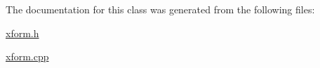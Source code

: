 The documentation for this class was generated from the following files\-:\begin{DoxyCompactItemize}
\item 
\hyperlink{xform_8h}{xform.\-h}\item 
\hyperlink{xform_8cpp}{xform.\-cpp}\end{DoxyCompactItemize}
